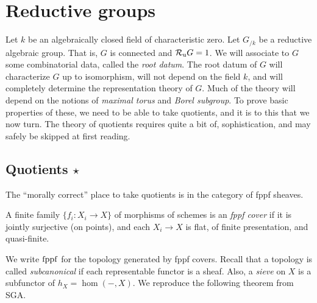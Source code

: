








\section{Reductive groups}

Let $k$ be an algebraically closed field of characteristic zero. Let 
$G_{/k}$ be a reductive algebraic group. That is, $G$ is connected and 
$\mathcal{R}_\mathrm{u} G=1$. We will associate to $G$ some combinatorial data, called the 
\emph{root datum}. The root datum of $G$ will characterize $G$ up to 
isomorphism, will not depend on the field $k$, and will completely determine 
the representation theory of $G$. Much of the theory will depend on the 
notions of \emph{maximal torus} and \emph{Borel subgroup}. To prove basic 
properties of these, we need to be able to take quotients, and it is to this 
that we now turn. The theory of quotients requires quite a bit of, 
sophistication, and may safely be skipped at first reading. 





\subsection{Quotients \texorpdfstring{$\star$}{*}}

The ``morally correct'' place to take quotients is in the category of 
fppf sheaves. 

\begin{definition}
A finite family $\{f_i:X_i\to X\}$ of morphisms of schemes is an 
\emph{fppf cover} if it is jointly surjective (on points), and each 
$X_i\to X$ is flat, of finite presentation, and quasi-finite. 
\end{definition}

We write $\mathrm{fppf}$ for the topology generated by fppf covers. Recall that a 
topology is called \emph{subcanonical} if each representable functor is a 
sheaf. Also, a \emph{sieve} on $X$ is a subfunctor of $h_X=\hom(-,X)$. 
We reproduce the following theorem from SGA. 

